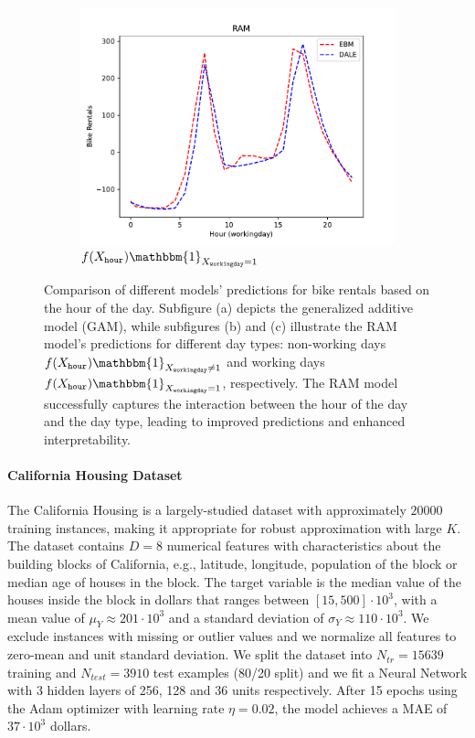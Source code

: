 \documentclass[12pt]{article}
\newcommand{\when}[1]{\mathbbm{1}_{#1}}
\begin{document}
\begin{figure}[htbp]
    \begin{subfigure}{0.32\textwidth}
        \centering
        \includegraphics[width=\textwidth]{figures/bike_rentals_ram_2}
        \caption{\(f(X_{\mathtt{hour}}) \when{X_{\mathtt{workingday}} = 1}\)}
        \label{subfig:bike_rentals_regional_gam_2}
    \end{subfigure}
    \caption{Comparison of different models' predictions for bike rentals based on the hour of the day.
    Subfigure (a) depicts the generalized additive model (GAM),
        while subfigures (b) and (c) illustrate the RAM model's predictions for different day types: non-working days
        \(f(X_{\mathtt{hour}}) \when{X_{\mathtt{workingday}} \neq 1}\) and
        working days \(f(X_{\mathtt{hour}}) \when{X_{\mathtt{workingday}} = 1}\), respectively.
        The RAM model successfully captures the interaction between the hour of the day and the day type,
        leading to improved predictions and enhanced interpretability.}
    \label{fig:bike_sharing}
\end{figure}


\paragraph{California Housing Dataset}
The California Housing is a largely-studied dataset with approximately
\(20000\) training instances, making it appropriate for robust
approximation with large \(K\).  The dataset contains \(D=8\)
numerical features with characteristics about the building blocks of
California, e.g., latitude, longitude, population of the block or
median age of houses in the block.  The target variable is the median
value of the houses inside the block in dollars that ranges between
\([15, 500] \cdot 10^3\), with a mean value of
\(\mu_Y \approx 201 \cdot 10^3 \) and a standard deviation of
\(\sigma_Y \approx 110 \cdot 10^3\). We exclude instances with missing
or outlier values and we normalize all features to zero-mean and unit
standard deviation. We split the dataset into \(N_{tr} = 15639\)
training and \(N_{test} = 3910\) test examples (80/20 split) and we
fit a Neural Network with 3 hidden layers of 256, 128 and 36 units
respectively.  After 15 epochs using the Adam optimizer with learning
rate \(\eta = 0.02\), the model achieves a MAE of \(37 \cdot 10^3\)
dollars.
\end{document}
